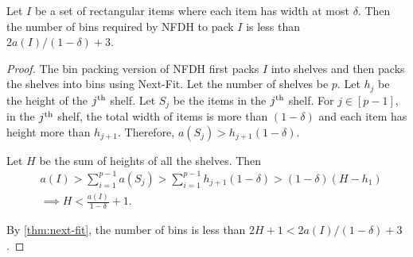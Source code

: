 \begin{lemma}
\label{thm:nfdh-tall}
Let $I$ be a set of rectangular items where each item has width at most $\delta$.
Then the number of bins required by NFDH to pack $I$ is less than $2a(I)/(1-\delta) + 3$.
\end{lemma}
\begin{proof}
The bin packing version of NFDH first packs $I$ into shelves
and then packs the shelves into bins using Next-Fit.
Let the number of shelves be $p$.
Let $h_j$ be the height of the $j^{\textrm{th}}$ shelf.
Let $S_j$ be the items in the $j^{\textrm{th}}$ shelf.
For $j \in [p-1]$, in the $j^{\textrm{th}}$ shelf, the total width of items is
more than $(1-\delta)$ and each item has height more than $h_{j+1}$.
Therefore, $a(S_j) > h_{j+1}(1-\delta)$.

Let $H$ be the sum of heights of all the shelves. Then
\begin{align*}
& a(I) > \sum_{i=1}^{p-1} a(S_j) > \sum_{i=1}^{p-1} h_{j+1}(1-\delta) > (1-\delta)(H - h_1)
\\ &\implies H < \frac{a(I)}{1-\delta} + 1.
\end{align*}

By \cref{thm:next-fit}, the number of bins is less than $2H + 1 < 2a(I)/(1-\delta) + 3$.
\end{proof}

